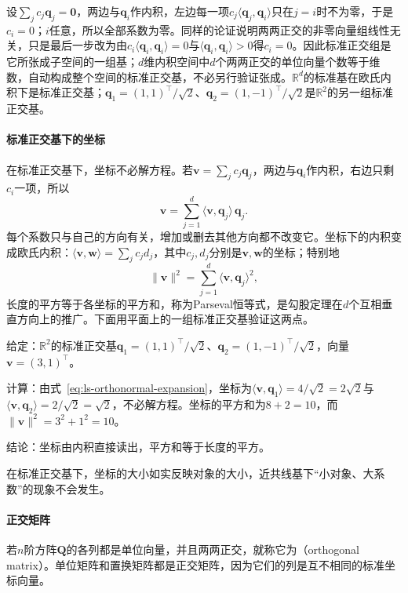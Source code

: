 设$\sum_jc_j\bm q_j=\bm0$，两边与$\bm q_i$作内积，左边每一项$c_j\langle\bm q_j,\bm q_i\rangle$只在$j=i$时不为零，于是$c_i=0$；$i$任意，所以全部系数为零。同样的论证说明两两正交的非零向量组线性无关，只是最后一步改为由$c_i\langle\bm q_i,\bm q_i\rangle=0$与$\langle\bm q_i,\bm q_i\rangle>0$得$c_i=0$。因此标准正交组是它所张成子空间的一组基；$d$维内积空间中$d$个两两正交的单位向量个数等于维数，自动构成整个空间的标准正交基，不必另行验证张成。$\mathbb R^d$的标准基在欧氏内积下是标准正交基；$\bm q_1=(1,1)^\top/\sqrt2$、$\bm q_2=(1,-1)^\top/\sqrt2$是$\mathbb R^2$的另一组标准正交基。

\paragraph{标准正交基下的坐标}
在标准正交基下，坐标不必解方程。若$\bm v=\sum_jc_j\bm q_j$，两边与$\bm q_i$作内积，右边只剩$c_i$一项，所以
\begin{equation}
 \bm v=\sum_{j=1}^d\langle\bm v,\bm q_j\rangle\,\bm q_j.
 \label{eq:ls-orthonormal-expansion}
\end{equation}
每个系数只与自己的方向有关，增加或删去其他方向都不改变它。坐标下的内积变成欧氏内积：$\langle\bm v,\bm w\rangle=\sum_jc_jd_j$，其中$c_j,d_j$分别是$\bm v,\bm w$的坐标；特别地
\begin{equation}
 \lVert\bm v\rVert^2=\sum_{j=1}^d\langle\bm v,\bm q_j\rangle^2,
 \label{eq:ls-parseval}
\end{equation}
长度的平方等于各坐标的平方和，称为Parseval恒等式，是勾股定理在$d$个互相垂直方向上的推广。下面用平面上的一组标准正交基验证这两点。
\begin{example}[标准正交基下的坐标与Parseval恒等式]
\label{ex:ls-orthonormal-coordinates}
给定：$\mathbb R^2$的标准正交基$\bm q_1=(1,1)^\top/\sqrt2$、$\bm q_2=(1,-1)^\top/\sqrt2$，向量$\bm v=(3,1)^\top$。

计算：由式~\eqref{eq:ls-orthonormal-expansion}，坐标为$\langle\bm v,\bm q_1\rangle=4/\sqrt2=2\sqrt2$与$\langle\bm v,\bm q_2\rangle=2/\sqrt2=\sqrt2$，不必解方程。坐标的平方和为$8+2=10$，而$\lVert\bm v\rVert^2=3^2+1^2=10$。

结论：坐标由内积直接读出，平方和等于长度的平方。
\end{example}
在标准正交基下，坐标的大小如实反映对象的大小，近共线基下“小对象、大系数”的现象不会发生。

\paragraph{正交矩阵}
\label{sec:ls-orthogonal-matrices}
若$n$阶方阵$\bm Q$的各列都是单位向量，并且两两正交，就称它为（orthogonal matrix）。单位矩阵和置换矩阵都是正交矩阵，因为它们的列是互不相同的标准坐标向量。

